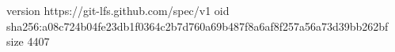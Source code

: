 version https://git-lfs.github.com/spec/v1
oid sha256:a08c724b04fe23db1f0364c2b7d760a69b487f8a6af8f257a56a73d39bb262bf
size 4407
